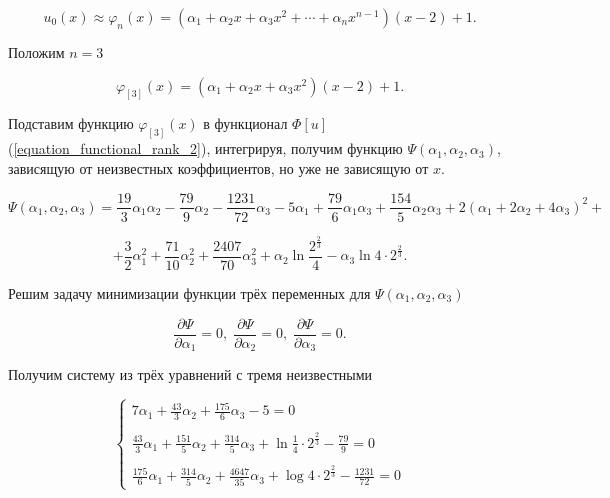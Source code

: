 \documentclass{article}
\begin{document}
\begin{displaymath}
	u_{0}(x) \approx \varphi_{n}(x) = (\alpha_{1} + \alpha_{2}x + \alpha_{3}x^2 + \cdots + \alpha_{n}x^{n-1})(x-2)+1.
\end{displaymath}

\noindent Положим $n = 3$

\begin{displaymath}
	\varphi_{[3]}(x) = (\alpha_{1} + \alpha_{2}x + \alpha_{3}x^2)(x-2)+1.
\end{displaymath}

\noindent Подставим функцию $\varphi_{[3]}(x)$ в функционал $\Phi[u]$ (\ref{equation_functional_rank_2}), интегрируя, получим функцию $\Psi(\alpha_{1}, \alpha_{2}, \alpha_{3})$, зависящую от неизвестных коэффициентов, но уже не зависящую от $x$.

\begin{displaymath}
	\Psi(\alpha_{1}, \alpha_{2}, \alpha_{3}) = \frac{19}{3}\alpha_{1}\alpha_{2} - \frac{79}{9}\alpha_{2} - \frac{1231}{72}\alpha_{3} - 5\alpha_{1} + \frac{79}{6}\alpha_{1}\alpha_{3} + \frac{154}{5}\alpha_{2}\alpha_{3} + 2(\alpha_{1} + 2 \alpha_{2} + 4\alpha_{3})^2 +
\end{displaymath}
	
\begin{displaymath}	
	 + \frac{3}{2}\alpha_{1}^{2} +  \frac{71}{10}\alpha_{2}^{2} + \frac{2407}{70}\alpha_{3}^{2} + \alpha_{2} \ln{\frac{2^{\frac{2}{3}}}{4}} - \alpha_{3} \ln{4 \cdot 2^{\frac{2}{3}}}.
\end{displaymath}

\noindent Решим задачу минимизации функции трёх переменных для $\Psi(\alpha_{1}, \alpha_{2}, \alpha_{3})$

\begin{displaymath}
	\frac{\partial \Psi}{\partial \alpha_{1}} = 0, \;
	\frac{\partial \Psi}{\partial \alpha_{2}} = 0, \;
	\frac{\partial \Psi}{\partial \alpha_{3}} = 0.
\end{displaymath}

\noindent Получим систему из трёх уравнений с тремя неизвестными

\begin{displaymath}
	\begin{cases}
		7\alpha_{1} + \frac{43}{3}\alpha_{2} + \frac{175}{6}\alpha_{3} - 5 = 0 \\
		\\
		\frac{43}{3}\alpha_{1} + \frac{151}{5}\alpha_{2} + \frac{314}{5}\alpha_{3} + \ln{\frac{1}{4} \cdot 2^{\frac{2}{3}}} - \frac{79}{9} = 0 \\
		\\
		\frac{175}{6}\alpha_{1} + \frac{314}{5}\alpha_{2} + \frac{4647}{35}\alpha_{3} + \log{4 \cdot 2^{\frac{2}{3}}} - \frac{1231}{72} = 0
	\end{cases}
\end{displaymath}
\end{document}
